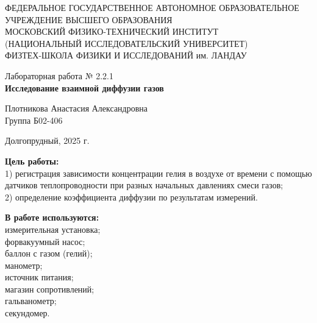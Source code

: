 \documentclass[a4paper,12pt]{article} %
\begin{document}
\begin{center}
	\footnotesize{ФЕДЕРАЛЬНОЕ ГОСУДАРСТВЕННОЕ АВТОНОМНОЕ ОБРАЗОВАТЕЛЬНОЕ 			УЧРЕЖДЕНИЕ ВЫСШЕГО ОБРАЗОВАНИЯ}\\
	\footnotesize{МОСКОВСКИЙ ФИЗИКО-ТЕХНИЧЕСКИЙ ИНСТИТУТ\\(НАЦИОНАЛЬНЫЙ 			ИССЛЕДОВАТЕЛЬСКИЙ УНИВЕРСИТЕТ)}\\
	\footnotesize{ФИЗТЕХ-ШКОЛА ФИЗИКИ И ИССЛЕДОВАНИЙ им. ЛАНДАУ\\}
	\hfill \break
	\hfill \break
	\hfill \break
	\hfill \break
\end{center}

\begin{center}   
    \hfill \break
	\hfill \break
	\hfill \break
	\hfill \break    \hfill \break
	\hfill \break
	\hfill \break
	\hfill \break
    \hfill \break
    \hfill \break
	\hfill \break
	\large{Лабораторная работа № 2.2.1\\\textbf{Исследование взаимной диффузии газов}}\\
	\begin{flushright}
		Плотникова Анастасия Александровна\\
		Группа Б02-406
	\end{flushright}
	\hfill \break
	\hfill \break
	\hfill \break
\end{center}
\hfill \break
\hfill \break
\hfill \break
\hfill \break
\hfill \break
\hfill \break
\hfill \break
\hfill \break
\hfill \break
\hfill \break
\hfill \break
\hfill \break
\hfill \break
\begin{center}
	Долгопрудный, 2025 г.
\end{center}
\thispagestyle{empty}
\newpage
	\textbf{Цель работы:}\\ 
  1) регистрация зависимости концентрации гелия в воздухе от времени с помощью датчиков теплопроводности при разных начальных давлениях смеси газов;\\ 
  2) определение коэффициента диффузии по результатам измерений.
	\hfill \break
	
	\textbf{В работе используются:}\\ 
  измерительная установка;\\ 
  форвакуумный насос;\\ 
  баллон с газом (гелий);\\ 
  манометр;\\ 
  источник питания;\\ 
  магазин сопротивлений;\\ 
  гальванометр;\\ 
  секундомер.
	\hfill \break
\end{document}
